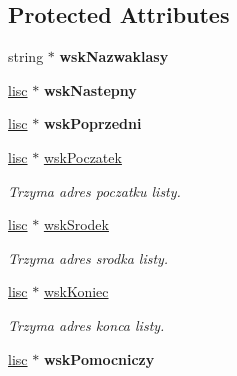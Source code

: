 \subsection*{Protected Attributes}
\begin{DoxyCompactItemize}
\item 
\hypertarget{classdrzewo_a7c23ead9c572d7527edd645823f66ded}{
string $\ast$ {\bfseries wskNazwaklasy}}
\label{classdrzewo_a7c23ead9c572d7527edd645823f66ded}

\item 
\hypertarget{classdrzewo_a604d6054c567c2b086e51ac277acde69}{
\hyperlink{classdrzewo_1_1lisc}{lisc} $\ast$ {\bfseries wskNastepny}}
\label{classdrzewo_a604d6054c567c2b086e51ac277acde69}

\item 
\hypertarget{classdrzewo_a7700a05d55b353d0c9f419b1428c75ad}{
\hyperlink{classdrzewo_1_1lisc}{lisc} $\ast$ {\bfseries wskPoprzedni}}
\label{classdrzewo_a7700a05d55b353d0c9f419b1428c75ad}

\item 
\hypertarget{classdrzewo_abf545a65e743e70d70a1947ac35c73d9}{
\hyperlink{classdrzewo_1_1lisc}{lisc} $\ast$ \hyperlink{classdrzewo_abf545a65e743e70d70a1947ac35c73d9}{wskPoczatek}}
\label{classdrzewo_abf545a65e743e70d70a1947ac35c73d9}

\begin{DoxyCompactList}\small\item\em Trzyma adres poczatku listy. \item\end{DoxyCompactList}\item 
\hypertarget{classdrzewo_acba6bb799cb3d30c63eff67ac2bc2225}{
\hyperlink{classdrzewo_1_1lisc}{lisc} $\ast$ \hyperlink{classdrzewo_acba6bb799cb3d30c63eff67ac2bc2225}{wskSrodek}}
\label{classdrzewo_acba6bb799cb3d30c63eff67ac2bc2225}

\begin{DoxyCompactList}\small\item\em Trzyma adres srodka listy. \item\end{DoxyCompactList}\item 
\hypertarget{classdrzewo_af5da627dbc719e872f654ea31105c41f}{
\hyperlink{classdrzewo_1_1lisc}{lisc} $\ast$ \hyperlink{classdrzewo_af5da627dbc719e872f654ea31105c41f}{wskKoniec}}
\label{classdrzewo_af5da627dbc719e872f654ea31105c41f}

\begin{DoxyCompactList}\small\item\em Trzyma adres konca listy. \item\end{DoxyCompactList}\item 
\hypertarget{classdrzewo_a633af0796f4cd10721a9d256813709f2}{
\hyperlink{classdrzewo_1_1lisc}{lisc} $\ast$ {\bfseries wskPomocniczy}}
\label{classdrzewo_a633af0796f4cd10721a9d256813709f2}


\end{DoxyCompactItemize}
